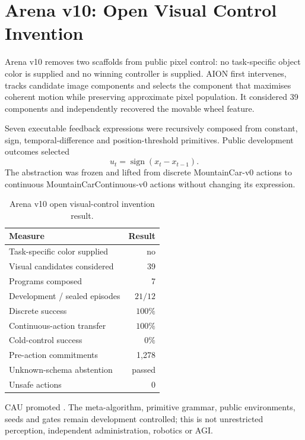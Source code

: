 \section{Arena v10: Open Visual Control Invention}
\label{sec:arena-v10-open-visual-control}

Arena v10 removes two scaffolds from public pixel control: no task-specific
object color is supplied and no winning controller is supplied. AION first
intervenes, tracks candidate image components and selects the component that
maximises coherent motion while preserving approximate pixel population. It
considered 39 components and independently recovered the movable wheel feature.

Seven executable feedback expressions were recursively composed from constant,
sign, temporal-difference and position-threshold primitives. Public development
outcomes selected
\begin{equation}
 u_t=\operatorname{sign}(x_t-x_{t-1}).
\end{equation}
The abstraction was frozen and lifted from discrete MountainCar-v0 actions to
continuous MountainCarContinuous-v0 actions without changing its expression.

\begin{table}[ht]
\centering\small
\begin{tabular}{@{}lr@{}}
\hline
Measure & Result \\
\hline
Task-specific color supplied & no \\
Visual candidates considered & 39 \\
Programs composed & 7 \\
Development / sealed episodes & $21/12$ \\
Discrete success & $100\%$ \\
Continuous-action transfer & $100\%$ \\
Cold-control success & $0\%$ \\
Pre-action commitments & 1,278 \\
Unknown-schema abstention & passed \\
Unsafe actions & 0 \\
\hline
\end{tabular}
\caption{Arena v10 open visual-control invention result.}
\end{table}

CAU promoted .
The meta-algorithm, primitive grammar, public environments, seeds and gates
remain development controlled; this is not unrestricted perception,
independent administration, robotics or AGI.

